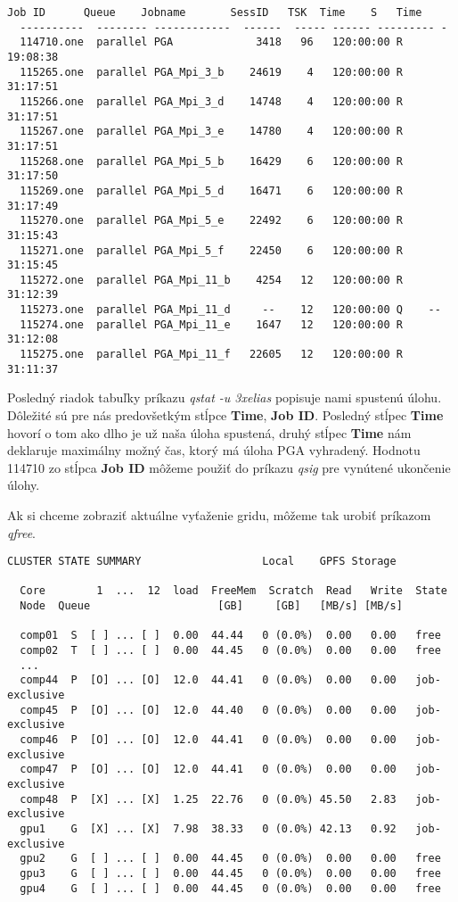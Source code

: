 \begin{lstlisting}[caption={qstat -u 3xelias}]
  Job ID      Queue    Jobname       SessID   TSK  Time    S   Time
  ----------  -------- ------------  ------  ----- ------ --------- - 
  114710.one  parallel PGA             3418   96   120:00:00 R 19:08:38
  115265.one  parallel PGA_Mpi_3_b    24619    4   120:00:00 R 31:17:51
  115266.one  parallel PGA_Mpi_3_d    14748    4   120:00:00 R 31:17:51
  115267.one  parallel PGA_Mpi_3_e    14780    4   120:00:00 R 31:17:51
  115268.one  parallel PGA_Mpi_5_b    16429    6   120:00:00 R 31:17:50
  115269.one  parallel PGA_Mpi_5_d    16471    6   120:00:00 R 31:17:49
  115270.one  parallel PGA_Mpi_5_e    22492    6   120:00:00 R 31:15:43
  115271.one  parallel PGA_Mpi_5_f    22450    6   120:00:00 R 31:15:45
  115272.one  parallel PGA_Mpi_11_b    4254   12   120:00:00 R 31:12:39
  115273.one  parallel PGA_Mpi_11_d     --    12   120:00:00 Q    -- 
  115274.one  parallel PGA_Mpi_11_e    1647   12   120:00:00 R 31:12:08
  115275.one  parallel PGA_Mpi_11_f   22605   12   120:00:00 R 31:11:37
\end{lstlisting}

Posledný riadok tabuľky príkazu \textit{qstat -u 3xelias} popisuje nami spustenú úlohu.
Dôležité sú pre nás predovšetkým stĺpce \textbf{Time}, \textbf{Job ID}.
Posledný stĺpec \textbf{Time} hovorí o tom ako dlho je už naša úloha spustená, druhý stĺpec \textbf{Time} nám deklaruje maximálny možný čas,
ktorý má úloha PGA vyhradený. Hodnotu 114710 zo stĺpca \textbf{Job ID} môžeme použiť do príkazu \textit{qsig} pre vynútené ukončenie úlohy.

Ak si chceme zobraziť aktuálne vyťaženie gridu, môžeme tak urobiť príkazom \textit{qfree}.

\begin{lstlisting}[caption={qfree}]
  CLUSTER STATE SUMMARY                   Local    GPFS Storage
  
  Core        1  ...  12  load  FreeMem  Scratch  Read   Write  State
  Node  Queue                    [GB]     [GB]   [MB/s] [MB/s]
  
  comp01  S  [ ] ... [ ]  0.00  44.44   0 (0.0%)  0.00   0.00   free
  comp02  T  [ ] ... [ ]  0.00  44.45   0 (0.0%)  0.00   0.00   free
  ...
  comp44  P  [O] ... [O]  12.0  44.41   0 (0.0%)  0.00   0.00   job-exclusive
  comp45  P  [O] ... [O]  12.0  44.40   0 (0.0%)  0.00   0.00   job-exclusive
  comp46  P  [O] ... [O]  12.0  44.41   0 (0.0%)  0.00   0.00   job-exclusive
  comp47  P  [O] ... [O]  12.0  44.41   0 (0.0%)  0.00   0.00   job-exclusive
  comp48  P  [X] ... [X]  1.25  22.76   0 (0.0%) 45.50   2.83   job-exclusive
  gpu1    G  [X] ... [X]  7.98  38.33   0 (0.0%) 42.13   0.92   job-exclusive
  gpu2    G  [ ] ... [ ]  0.00  44.45   0 (0.0%)  0.00   0.00   free
  gpu3    G  [ ] ... [ ]  0.00  44.45   0 (0.0%)  0.00   0.00   free
  gpu4    G  [ ] ... [ ]  0.00  44.45   0 (0.0%)  0.00   0.00   free
\end{lstlisting}

